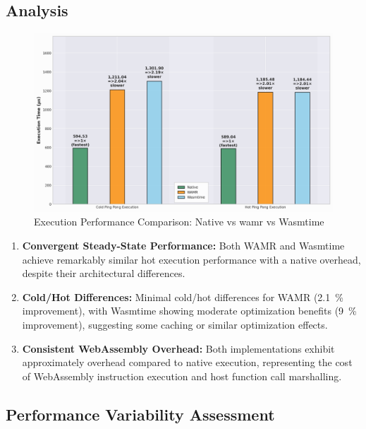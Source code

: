 \subsection{Analysis}

\begin{figure}[h]
    \centering
    \includegraphics[width=1.0\textwidth]{images/wasm-execution-rel}
    \caption{Execution Performance Comparison: Native vs \acrshort{wamr} vs Wasmtime}
    \label{fig:wasm-execution-relative}
\end{figure}

\begin{enumerate}
    \item \textbf{Convergent Steady-State Performance:} Both WAMR and Wasmtime achieve remarkably similar hot execution performance with a  native overhead, despite their architectural differences.
    
    \item \textbf{Cold/Hot Differences:} Minimal cold/hot differences for WAMR (\SI[round-precision=1]{2.1}{\percent} improvement), with Wasmtime showing moderate optimization benefits (\SI[round-precision=1]{9}{\percent} improvement), suggesting some caching or similar optimization effects.
    
    \item \textbf{Consistent WebAssembly Overhead:} Both implementations exhibit approximately  overhead compared to native execution, representing the cost of WebAssembly instruction execution and host function call marshalling.
\end{enumerate}

\subsection{Performance Variability Assessment}
\label{subsec:eval-execution-variability}

